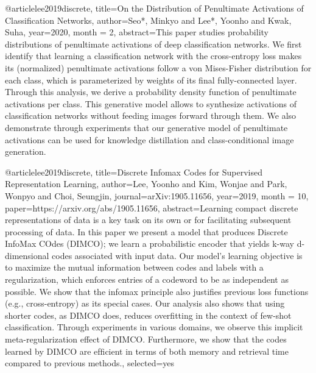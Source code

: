 
@article{lee2019discrete,
  title={On the Distribution of Penultimate Activations of Classification Networks},
  author={Seo*, Minkyo and Lee*, Yoonho and Kwak, Suha},
  year={2020},
  month = {2},
  abstract={This paper studies probability distributions of penultimate activations of deep classification networks. We first identify that learning a classification network with the cross-entropy loss makes its (normalized) penultimate activations follow a von Mises-Fisher distribution for each class, which is parameterized by weights of its final fully-connected layer. Through this analysis, we derive a probability density function of penultimate activations per class. This generative model allows to synthesize activations of classification networks without feeding images forward through them. We also demonstrate through experiments that our generative model of penultimate activations can be used for knowledge distillation and class-conditional image generation.}
}

@article{lee2019discrete,
  title={Discrete Infomax Codes for Supervised Representation Learning},
  author={Lee, Yoonho and Kim, Wonjae and Park, Wonpyo and Choi, Seungjin},
  journal={arXiv:1905.11656},
  year={2019},
  month = {10},
  paper={https://arxiv.org/abs/1905.11656},
  abstract={Learning compact discrete representations of data is a key task on its own or for facilitating subsequent processing of data. In this paper we present a model that produces Discrete InfoMax COdes (DIMCO); we learn a probabilistic encoder that yields k-way d-dimensional codes associated with input data. Our model’s learning objective is to maximize the mutual information between codes and labels with a regularization, which enforces entries of a codeword to be as independent as possible. We show that the infomax principle also justiﬁes previous loss functions (e.g., cross-entropy) as its special cases. Our analysis also shows that using shorter codes, as DIMCO does, reduces overﬁtting in the context of few-shot classiﬁcation. Through experiments in various domains, we observe this implicit meta-regularization effect of DIMCO. Furthermore, we show that the codes learned by DIMCO are efﬁcient in terms of both memory and retrieval time compared to previous methods.},
  selected={yes}
}

